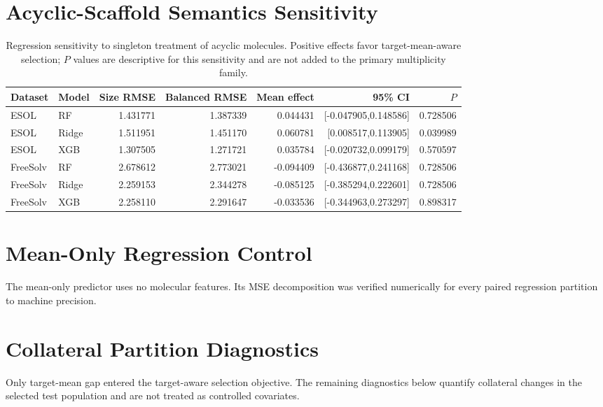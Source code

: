 \section{Acyclic-Scaffold Semantics Sensitivity}
\label{sec:si-acyclic}

\begin{table}[!htbp]
\centering
\caption{Regression sensitivity to singleton treatment of acyclic molecules. Positive effects favor target-mean-aware selection; $P$ values are descriptive for this sensitivity and are not added to the primary multiplicity family.}
\label{tab:si-acyclic}
\begin{tabular}{llrrrrr}
\toprule
Dataset & Model & Size RMSE & Balanced RMSE & Mean effect & 95\% CI & $P$ \\
\midrule
ESOL & RF & 1.431771 & 1.387339 & 0.044431 & [-0.047905,0.148586] & 0.728506 \\
ESOL & Ridge & 1.511951 & 1.451170 & 0.060781 & [0.008517,0.113905] & 0.039989 \\
ESOL & XGB & 1.307505 & 1.271721 & 0.035784 & [-0.020732,0.099179] & 0.570597 \\
FreeSolv & RF & 2.678612 & 2.773021 & -0.094409 & [-0.436877,0.241168] & 0.728506 \\
FreeSolv & Ridge & 2.259153 & 2.344278 & -0.085125 & [-0.385294,0.222601] & 0.728506 \\
FreeSolv & XGB & 2.258110 & 2.291647 & -0.033536 & [-0.344963,0.273297] & 0.898317 \\
\bottomrule
\end{tabular}
\end{table}

\section{Mean-Only Regression Control}
\label{sec:si-mean-only}

The mean-only predictor uses no molecular features. Its MSE decomposition was verified numerically for every paired regression partition to machine precision.



\section{Collateral Partition Diagnostics}
\label{sec:si-collateral}

Only target-mean gap entered the target-aware selection objective. The remaining diagnostics below quantify collateral changes in the selected test population and are not treated as controlled covariates.

